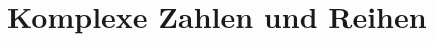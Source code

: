 \documentclass[../main.tex]{subfiles}
\begin{document}
\chapter{Komplexe Zahlen und Reihen}
\end{document}
